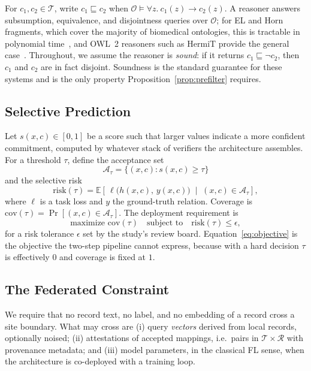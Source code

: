 \documentclass[conference]{IEEEtran}
\newcommand{\onto}{\mathcal{O}}
\newcommand{\att}{\mathcal{A}}
\begin{document}
For $c_1, c_2 \in \mathcal{T}$, write $c_1 \sqsubseteq c_2$ when $\onto \models \forall z.\ c_1(z) \rightarrow c_2(z)$. A reasoner answers subsumption, equivalence, and disjointness queries over $\onto$; for EL and Horn fragments, which cover the majority of biomedical ontologies, this is tractable in polynomial time~\cite{b31}, and OWL~2 reasoners such as HermiT provide the general case~\cite{b30,b32}. Throughout, we assume the reasoner is \emph{sound}: if it returns $c_1 \sqsubseteq \neg c_2$, then $c_1$ and $c_2$ are in fact disjoint. Soundness is the standard guarantee for these systems and is the only property Proposition~\ref{prop:prefilter} requires.

\subsection{Selective Prediction}

Let $s(x,c) \in [0,1]$ be a score such that larger values indicate a more confident commitment, computed by whatever stack of verifiers the architecture assembles. For a threshold $\tau$, define the acceptance set
\begin{equation}
\att_\tau = \{(x,c) : s(x,c) \ge \tau\}
\end{equation}
and the selective risk
\begin{equation}
\mathrm{risk}(\tau) = \mathbb{E}\!\left[\, \ell\big(h(x,c),\, y(x,c)\big) \;\middle|\; (x,c) \in \att_\tau \right],
\end{equation}
where $\ell$ is a task loss and $y$ the ground-truth relation. Coverage is $\mathrm{cov}(\tau) = \Pr[(x,c) \in \att_\tau]$. The deployment requirement is
\begin{equation}
\text{maximize } \mathrm{cov}(\tau) \quad \text{subject to} \quad \mathrm{risk}(\tau) \le \epsilon ,
\label{eq:objective}
\end{equation}
for a risk tolerance $\epsilon$ set by the study's review board. Equation~\eqref{eq:objective} is the objective the two-step pipeline cannot express, because with a hard decision $\tau$ is effectively $0$ and coverage is fixed at $1$.

\subsection{The Federated Constraint}

We require that no record text, no label, and no embedding of a record cross a site boundary. What may cross are (i) query \emph{vectors} derived from local records, optionally noised; (ii) attestations of accepted mappings, i.e.\ pairs in $\mathcal{T} \times \mathcal{R}$ with provenance metadata; and (iii) model parameters, in the classical FL sense, when the architecture is co-deployed with a training loop.
\end{document}
